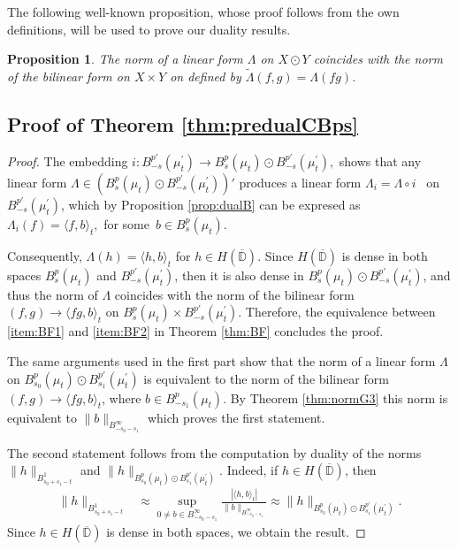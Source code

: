 \documentclass[12pt,twoside,leqno,final]{amsart}
\theoremstyle{plain}
\newtheorem{prop}[thm]{Proposition}
\begin{document}
The following well-known proposition, whose proof follows from the own definitions,
 will be used to prove our duality results.

\begin{prop}\label{prop:dualwproduct}
The norm of a linear form $\Lambda$ on $X\odot Y$ coincides with the norm of 
the bilinear form on $X\times Y$ on defined by $\tilde\Lambda(f,g)=\Lambda(fg)$.
\end{prop}

\subsection{Proof of Theorem \ref{thm:predualCBps}}
\begin{proof}
The embedding 
$
i:B^{p'}_{-s}(\mu^\prime_t)\to B^p_s(\mu_t)\odot B^{p'}_{-s}(\mu^\prime_t),
$
shows that any linear form $\Lambda \in (B^p_s(\mu_t)\odot B^{p'}_{-s}(\mu^\prime_t))'$ 
produces a linear form $\Lambda_i=\Lambda\circ i$ \, on $B^{p'}_{-s}(\mu^\prime_t)$, 
which by Proposition \ref{prop:dualB} can be expresed as  
$\Lambda_i(f)=\langle f,b\rangle_t,$ for some $\,b\in B^p_s(\mu_t).$

Consequently, $\Lambda(h)=\langle h,b\rangle_t$ for $h\in H(\overline{{\mathbb D}})$. 
Since $H(\overline{{\mathbb D}})$ is dense in both spaces $B^p_s(\mu_t)$ 
and  $B^{p'}_{-s}(\mu^\prime_t)$, 
then it is also dense in $B^p_s(\mu_t)\odot B^{p'}_{-s}(\mu^\prime_t)$, 
and thus the norm of $\Lambda$ 
coincides with the norm of the bilinear form $(f,g)\to \langle fg,b\rangle_t$ 
on $B^p_s(\mu_t)\times  B^{p'}_{-s}(\mu^\prime_t)$.
 Therefore, the equivalence between \eqref{item:BF1} and \eqref{item:BF2} 
 in Theorem \ref{thm:BF} concludes the proof. 

The same arguments used in the first part show that the norm of a linear 
form $\Lambda$ on $B^p_{s_0}(\mu_t)\odot B^{p'}_{s_1}(\mu^\prime_t)$ 
is equivalent to the norm of the bilinear form 
$(f,g)\to \langle fg,b\rangle_t$, where $b\in B^p_{-s_1}(\mu_t)$.
By Theorem \ref{thm:normG3} this norm is equivalent to $\|b\|_{B^\infty_{-s_0-s_1}}$ 
which proves the first statement.

The second statement follows from the computation by duality of the norms  
$\|h\|_{B^1_{s_0+s_1-t}}$ and  $\|h\|_{B^p_{s_0}(\mu_t)\odot B^{p'}_{s_1}(\mu^\prime_t)}$.   
Indeed, if $h\in H(\overline {{\mathbb D}})$, then 
\begin{align*}
\|h\|_{B^1_{s_0+s_1-t}}
&\approx \sup_{0\ne b\in B^\infty_{-s_0-s_1}}
\frac{|\langle h,b\rangle_t|}{\|b\|_{B^\infty_{-s_0-s_1}}}
\approx \|h\|_{B^p_{s_0}(\mu_t)\odot B^{p'}_{s_1}(\mu^\prime_t)}.
\end{align*}
Since $h\in H(\overline {{\mathbb D}})$ is dense in both spaces, we obtain the result.
\end{proof}
\end{document}
